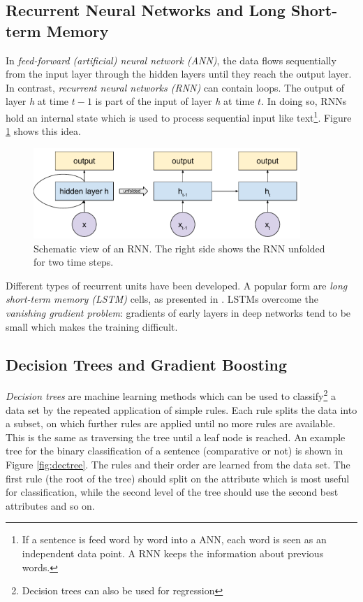 \subsection{Recurrent Neural Networks and Long Short-term Memory}
In \emph{feed-forward (artificial) neural network (ANN)}, the data flows sequentially from the input layer through the hidden layers until they reach the output layer. In contrast, \emph{recurrent neural networks (RNN)} can contain loops. The output of layer \emph{h} at time \emph{$t-1$} is part of the input of layer \emph{h} at time \emph{$t$}. In doing so, RNNs hold an internal state which is used to process sequential input like text\footnote{If a sentence is feed word by word into a ANN, each word is seen as an independent data point. A RNN keeps the information about previous words.}. Figure \ref{fig:rnnschema} shows this idea.

\begin{figure}[ht]
\centering
	\includegraphics[width=0.9\textwidth,scale=0.5]{images/rnn_schema}
	\caption{Schematic view of an RNN. The right side shows the RNN unfolded for two time steps.}
		\label{fig:rnnschema}
\end{figure}

Different types of recurrent units have been developed. A popular form are \emph{long short-term memory (LSTM)} cells, as presented in \cite{hochreiter1997long}. LSTMs overcome the \emph{vanishing gradient problem}: gradients of early layers in deep networks tend to be small which makes the training difficult.


\subsection{Decision Trees and Gradient Boosting}
\emph{Decision trees} are machine learning methods which can be used to classify\footnote{Decision trees can also be used for regression} a data set by the repeated application of simple rules. Each rule splits the data into a subset, on which further rules are applied until no more rules are available. This is the same as traversing the tree until a leaf node is reached. An example tree for the binary classification of a sentence (comparative or not) is shown in Figure \ref{fig:dectree}. The rules and their order are learned from the data set. The first rule (the root of the tree) should split on the attribute which is most useful for classification, while the second level of the tree should use the second best attributes and so on.

